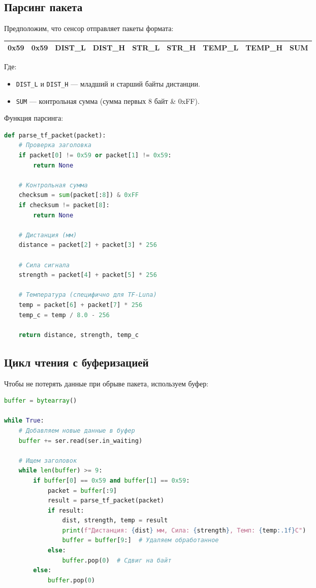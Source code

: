 \documentclass[12pt,a4paper]{article}
\begin{document}
\subsection{Парсинг пакета}
Предположим, что сенсор отправляет пакеты формата:

\begin{center}
\begin{tabular}{|c|c|c|c|c|c|c|c|c|}
\hline
0x59 & 0x59 & DIST\_L & DIST\_H & STR\_L & STR\_H & TEMP\_L & TEMP\_H & SUM \\
\hline
\end{tabular}
\end{center}

Где:
\begin{itemize}
    \item \texttt{DIST\_L} и \texttt{DIST\_H} — младший и старший байты дистанции.
    \item \texttt{SUM} — контрольная сумма (сумма первых 8 байт \& 0xFF).
\end{itemize}

Функция парсинга:
\begin{lstlisting}[language=Python]
def parse_tf_packet(packet):
    # Проверка заголовка
    if packet[0] != 0x59 or packet[1] != 0x59:
        return None
    
    # Контрольная сумма
    checksum = sum(packet[:8]) & 0xFF
    if checksum != packet[8]:
        return None
    
    # Дистанция (мм)
    distance = packet[2] + packet[3] * 256
    
    # Сила сигнала
    strength = packet[4] + packet[5] * 256
    
    # Температура (специфично для TF-Luna)
    temp = packet[6] + packet[7] * 256
    temp_c = temp / 8.0 - 256
    
    return distance, strength, temp_c
\end{lstlisting}

\subsection{Цикл чтения с буферизацией}
Чтобы не потерять данные при обрыве пакета, используем буфер:
\begin{lstlisting}[language=Python]
buffer = bytearray()

while True:
    # Добавляем новые данные в буфер
    buffer += ser.read(ser.in_waiting)
    
    # Ищем заголовок
    while len(buffer) >= 9:
        if buffer[0] == 0x59 and buffer[1] == 0x59:
            packet = buffer[:9]
            result = parse_tf_packet(packet)
            if result:
                dist, strength, temp = result
                print(f"Дистанция: {dist} мм, Сила: {strength}, Темп: {temp:.1f}C")
                buffer = buffer[9:]  # Удаляем обработанное
            else:
                buffer.pop(0)  # Сдвиг на байт
        else:
            buffer.pop(0)
\end{lstlisting}
\end{document}
